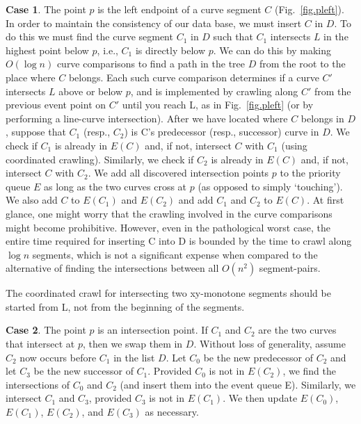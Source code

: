 {\bf Case 1}. The point $p$ is the left endpoint of a curve segment $C$ 
(Fig.~\ref{fig.pleft}).
In order to maintain the consistency of our data base, we must insert $C$ in $D$.
To do this we must find the curve segment $C_{1}$ in $D$ such that $C_{1}$
intersects $L$ in the highest point below $p$, i.e., $C_{1}$ is directly below $p$.
We can do this by making $O(\log n)$ curve comparisons to find
a path in the tree $D$ from the root to the place where $C$ belongs.
Each such curve comparison determines if a curve $C'$ intersects $L$ above or below $p$,
and is implemented by crawling along $C'$ from the previous event point on $C'$ until you 
reach L, as in Fig.~\ref{fig.pleft} (or by performing a line-curve intersection).
After we have located where $C$ belongs in $D$, suppose that $C_{1}$ (resp., $C_{2}$)
is C's predecessor (resp., successor) curve in $D$.
We check if $C_{1}$ is already in $E(C)$ and, if not, intersect $C$ with $C_{1}$
(using coordinated crawling).
Similarly, we check if $C_{2}$ is already in $E(C)$ and, if not, intersect $C$ with $C_{2}$.
We add all discovered intersection points $p$ to the priority queue $E$ as long 
as the two curves cross at $p$ (as opposed to simply `touching').
We also add $C$ to $E(C_{1})$ and $E(C_{2})$ and add $C_{1}$ and $C_{2}$ to $E(C)$.
At first glance, one might worry that the crawling involved in the curve 
	comparisons might become prohibitive.  However, even in the pathological worst case,
	the entire time required for inserting C into D is bounded by the time to
	crawl along $\log n$ segments, which is not a significant expense when compared to
	the alternative of finding the intersections between all $O(n^{2})$ segment-pairs.


The coordinated crawl for intersecting two xy-monotone segments should be started from L, not 
from the beginning of the segments.

{\bf Case 2}. The point $p$ is an intersection point.
If $C_{1}$ and $C_{2}$ are the two curves that intersect at $p$, then we swap them
in $D$.  Without loss of generality, assume $C_{2}$ now occurs before $C_{1}$ in the
list $D$.  Let $C_{0}$ be the new predecessor of $C_{2}$ and let $C_{3}$ be the 
new successor of $C_{1}$.
Provided $C_{0}$ is not in $E(C_{2})$, we find the intersections of $C_{0}$ and $C_{2}$
(and insert them into the event queue E).
Similarly, we intersect $C_{1}$ and $C_{3}$, provided $C_{3}$ is not in $E(C_{1})$. 
We then update $E(C_{0})$, $E(C_{1})$, $E(C_{2})$, and $E(C_{3})$ as necessary.


